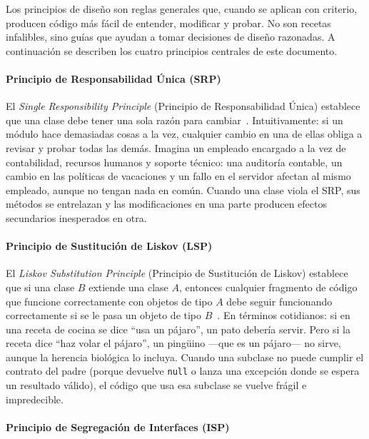 \documentclass[11pt,a4paper]{article}
\newcommand{\code}[1]{\texttt{#1}}
\begin{document}
Los principios de diseño son reglas generales que, cuando se aplican con
criterio, producen código más fácil de entender, modificar y probar.  No son
recetas infalibles, sino guías que ayudan a tomar decisiones de diseño
razonadas.  A continuación se describen los cuatro principios centrales de
este documento.

\label{sec:fund-srp}
\paragraph{Principio de Responsabilidad Única (SRP)}

El \emph{Single Responsibility Principle} (Principio de Responsabilidad Única)
establece que una clase debe tener una sola razón para cambiar~\cite{martin2003}.
Intuitivamente: si un módulo hace demasiadas cosas a la vez, cualquier cambio
en una de ellas obliga a revisar y probar todas las demás.  Imagina un empleado
encargado a la vez de contabilidad, recursos humanos y soporte técnico: una
auditoría contable, un cambio en las políticas de vacaciones y un fallo en el
servidor afectan al mismo empleado, aunque no tengan nada en común.  Cuando una
clase viola el SRP, sus métodos se entrelazan y las modificaciones en una parte
producen efectos secundarios inesperados en otra.

\label{sec:fund-lsp}
\paragraph{Principio de Sustitución de Liskov (LSP)}

El \emph{Liskov Substitution Principle} (Principio de Sustitución de Liskov)
establece que si una clase $B$ extiende una clase $A$, entonces cualquier
fragmento de código que funcione correctamente con objetos de tipo $A$ debe
seguir funcionando correctamente si se le pasa un objeto de tipo $B$~\cite{liskov1994}.
En términos cotidianos: si en una receta de cocina se dice ``usa un pájaro'',
un pato debería servir.  Pero si la receta dice ``haz volar el pájaro'', un
pingüino ---que es un pájaro--- no sirve, aunque la herencia biológica lo
incluya.  Cuando una subclase no puede cumplir el contrato del padre (porque
devuelve \code{null} o lanza una excepción donde se espera un resultado válido),
el código que usa esa subclase se vuelve frágil e impredecible.

\label{sec:fund-isp}
\paragraph{Principio de Segregación de Interfaces (ISP)}
\end{document}
